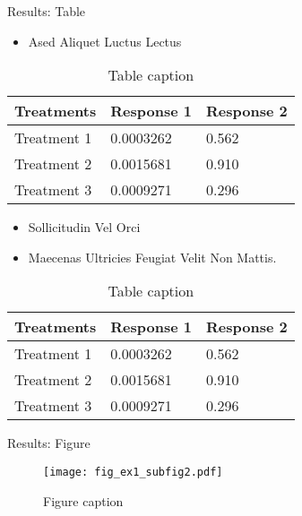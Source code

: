 \begin{block}{Results: Table}
	
	\begin{itemize}
		\item Ased Aliquet Luctus Lectus
	\end{itemize}
	
	\begin{table}
		\begin{tabular}{l l l}
			\toprule
			\textbf{Treatments} & \textbf{Response 1} & \textbf{Response 2}\\
			\midrule
			Treatment 1 & 0.0003262 & 0.562 \\
			Treatment 2 & 0.0015681 & 0.910 \\
			Treatment 3 & 0.0009271 & 0.296 \\
			\bottomrule
		\end{tabular}
		\caption{Table caption}
	\end{table}
	
	\begin{itemize}
		\item Sollicitudin Vel Orci
		\item Maecenas Ultricies Feugiat Velit Non Mattis.
	\end{itemize}
	
	\begin{table}
		\begin{tabular}{l l l}
			\toprule
			\textbf{Treatments} & \textbf{Response 1} & \textbf{Response 2}\\
			\midrule
			Treatment 1 & 0.0003262 & 0.562 \\
			Treatment 2 & 0.0015681 & 0.910 \\
			Treatment 3 & 0.0009271 & 0.296 \\
			\bottomrule
		\end{tabular}
		\caption{Table caption}
	\end{table}
	
\end{block}


\begin{block}{Results: Figure}
	
	\begin{figure}
		\texttt{[image: fig\_ex1\_subfig2.pdf]}
		\caption{Figure caption}
	\end{figure}
	
\end{block}

